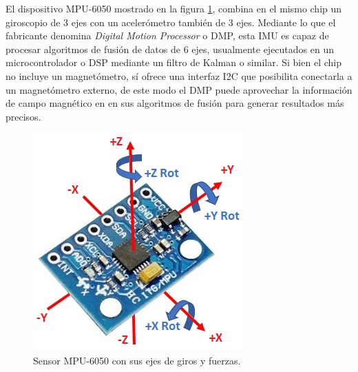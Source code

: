El dispositivo MPU-6050 mostrado en la figura \ref{fig:mpu6050}, combina en el mismo chip un giroscopio de 3 ejes con un acelerómetro también de 3 ejes. Mediante lo que el fabricante denomina \textit{Digital Motion Processor} o DMP, esta IMU es capaz de procesar algoritmos de fusión de datos de 6 ejes, usualmente ejecutados en un microcontrolador o DSP mediante un filtro de Kalman o similar. Si bien el chip no incluye un magnetómetro, sí ofrece una interfaz I2C que posibilita conectarla a un magnetómetro externo, de este modo el DMP puede aprovechar la información de campo magnético en en sus algoritmos de fusión para generar resultados más precisos.

\begin{figure}[ht]
    \centering
    \includegraphics[scale=0.5]{./Figures/mpu6050.jpg}
    \caption{Sensor MPU-6050 con sus ejes de giros y fuerzas.}
    \label{fig:mpu6050}
\end{figure}